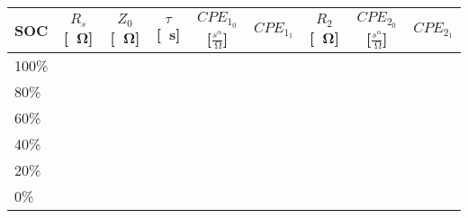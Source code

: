 
\begin{table*}[!htb]
\centering
\begin{tabular}{l|cccccccc}
\toprule
\textbf{SOC} & $R_s$[\SI{}{\ohm}] & $Z_0$ [\SI{}{\ohm}] & $ \tau $[\SI{}{\second}] & $CPE_1_0$ [$\frac{s^{\alpha}}{\SI{}{\ohm}}$] & $CPE_1_1$ & $R_2$[\SI{}{\ohm}] & $CPE_2_0$ [$\frac{s^{\alpha}}{\SI{}{\ohm}}$] & $CPE_2_1$ \\
\midrule
100\% &  &  &  &  &  &  &  &  \\  
 80\% &  &  &  &  &  &  &  &  \\  
 60\% &  &  &  &  &  &  &  &  \\  
 40\% &  &  &  &  &  &  &  &  \\  
 20\% &  &  &  &  &  &  &  &  \\  
 0\% &  &  &  &  &  &  &  &  \\  
 
\bottomrule
\end{tabular}
\caption{}
\label{}
\end{table*}
